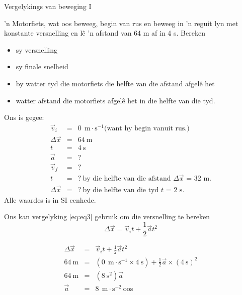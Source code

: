       \noindent
\begin{wex}{Vergelykings van beweging I}
{ 'n Motorfiets, wat oos beweeg, begin van rus en beweeg in  'n reguit lyn met konstante versnelling en l\^e  'n afstand van 64 m af in 4 s. Bereken
\begin{itemize}
    \item sy versnelling
    \item sy finale snelheid
    \item by watter tyd die motorfiets die helfte van die afstand afgel\^e het
    \item watter afstand die motorfiets afgel\^e het in die helfte van die tyd.
\end{itemize}}
{
Ons is gegee:
\begin{eqnarray*}
\vec{v}_i&=&0\ ~\text{m}\cdot \text{s}^{-1} \mbox{(want hy begin vanuit rus.)}\\
\Delta \vec{x}&=&64\ \text{m}\\
t&=&4\ \text{s}\\
\vec{a}&=&?\\
\vec{v}_f&=&?\\
t&=&?\ \mbox{by die helfte van die afstand $\Delta \vec{x}$~=~32~m.}\\
\Delta \vec{x}&=&?\ \mbox{by die helfte van die tyd $t$~=~2~s.}
\end{eqnarray*}
Alle waardes is in  SI eenhede.

Ons kan vergelyking \ref{eq:eq3} gebruik om die versnelling te bereken
\begin{displaymath}
\Delta \vec{x} = \vec{v}_it +\frac{1}{2}\vec{a}t^2
\end{displaymath}

\begin{eqnarray*}
\Delta \vec{x} &=& \vec{v}_it +\frac{1}{2}\vec{a}t^2\\
64\ \text{m} &=& (0\ ~\text{m}\cdot \text{s}^{-1} \times 4\ \text{s}) + \frac{1}{2} \vec{a} \times (4\ \text{s})^2\\
64\ \text{m} &=& (8\ \text{s}^2) \vec{a}\\
\vec{a} &=&8\ ~\text{m}\cdot \text{s}^{-2}~\text{oos}
\end{eqnarray*}

}
\end{wex}

